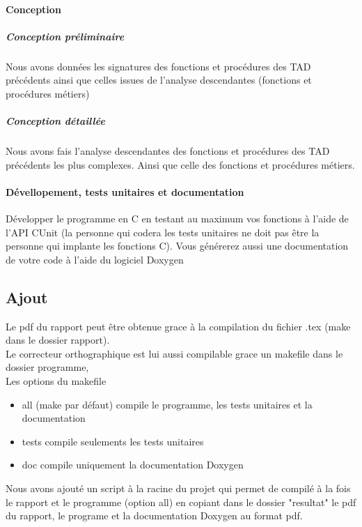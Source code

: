\paragraph{Conception}
\subparagraph{Conception préliminaire}
Nous avons données les signatures des fonctions et procédures des TAD précédents ainsi que celles issues de l'analyse descendantes (fonctions et procédures métiers)\\

\subparagraph{Conception détaillée}
Nous avons fais l'analyse descendantes des fonctions et procédures des TAD précédents les plus complexes. Ainsi que celle des fonctions et procédures métiers.\\

\paragraph{Dévellopement, tests unitaires et documentation}
Développer le programme en C en testant au maximum vos fonctions à l'aide de l'API CUnit (la personne qui codera les tests unitaires ne doit pas être la personne qui implante les fonctions C). Vous générerez aussi une documentation de votre code à l'aide du logiciel Doxygen\\

\subsection{Ajout}
Le pdf du rapport peut être obtenue grace à la compilation du fichier .tex (make dans le dossier rapport).\\
Le correcteur orthographique est lui aussi compilable grace un makefile dans le dossier programme,\\
Les options du makefile
\begin{itemize}
	\item all (make par défaut) compile le programme, les tests unitaires et la documentation\\
	\item tests compile seulements les tests unitaires\\
	\item doc compile uniquement la documentation Doxygen\\
\end{itemize}
Nous avons ajouté un script à la racine du projet qui permet de compilé à la fois le rapport et le programme (option all) en copiant dans le dossier "resultat" le pdf du rapport, le programe et la documentation Doxygen au format pdf.\\





